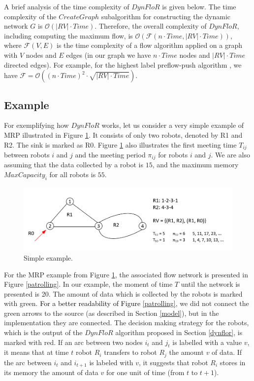 A brief analysis of the time complexity of $DynFloR$ is given below.  The time complexity of the $CreateGraph$ subalgorithm for constructing the dynamic network $G$ is $\mathcal{O}(|RV|\cdot Time)$. Therefore, the overall complexity of $DynFloR$, including computing the maximum flow, is $\mathcal{O}  \left( \mathcal{F}(n \cdot Time, |RV| \cdot Time) \right )$, where $\mathcal{F}(V, E)$ is the time complexity of a flow algorithm applied on a graph with $V$ nodes and $E$ edges (in our graph we have $n \cdot Time$ nodes and $|RV|\cdot Time$ directed edges). For example, for the highest label preflow-push algorithm \cite{Cormen:2009}, we have $\mathcal{F}=\mathcal{O} \left({(n \cdot Time)}^2 \cdot \sqrt{|RV|\cdot Time} \right)$. 



\subsection{Example}

For exemplifying how $DynFloR$ works, let us consider a very simple example of MRP illustrated in Figure \ref{ex:flow}. It consists of only two robots, denoted by R1 and R2. The sink is marked as R0. Figure \ref{ex:flow} also illustrates the first meeting time $T_{ij}$ between robots $i$ and $j$ and the meeting period $\pi_{ij}$ for robots $i$ and $j$. We are also assuming that the data collected by a robot is $15$, and the maximum memory $MaxCapacity_i$ for all robots is $55$. 

\begin{figure}[htb]
\centering
\includegraphics[scale=0.3]{Figures/SmallExaple.png}
\caption{Simple example.}
\label{ex:flow}
\end{figure}

For the MRP example from Figure \ref{ex:flow}, the associated flow network is presented in Figure \ref{patrolling}. In our example, the moment of time $T$ until the network is presented is 20. The amount of data which is collected by the robots is marked with green. \textcolor{black}{For a better readability of  Figure \ref{patrolling}}, we did not connect the green arrows to the source (as described in Section \ref{model}), but in the implementation they are connected. The decision making strategy for the robots, which is the output of the $DynFloR$ algorithm proposed in Section \ref{dynflor}, is marked with red. If an arc between two nodes $i_t$ and $j_t$ is labelled with a value $v$, it means that at time $t$ robot $R_i$ transfers to robot $R_j$ the amount $v$ of data. If the arc between $i_t$ and $i_{t+1}$ is labeled with $v$, it suggests that robot $R_i$ stores in its memory the amount of data $v$ for one unit of time (from $t$ to $t+1$).   

